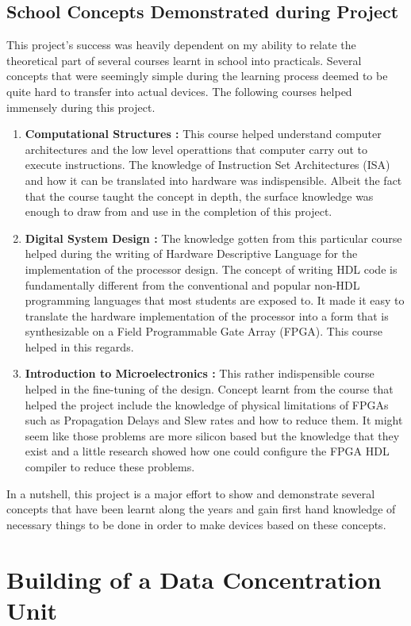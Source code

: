 \subsection{School Concepts Demonstrated during Project}
This project's success was heavily dependent on my ability to relate the theoretical part of several courses learnt in school into practicals. Several concepts that were seemingly simple during the learning process deemed to be quite hard to transfer into actual devices. The following courses helped immensely during this project.
\begin{enumerate}
\item \textbf{Computational Structures :} This course helped understand computer architectures and the low level operattions that computer carry out to execute instructions. The knowledge of Instruction Set Architectures (ISA) and how it can be translated into hardware was indispensible. Albeit the fact that the course taught the concept in depth, the surface knowledge was enough to draw from and use in the completion of this project.
\item \textbf{Digital System Design :} The knowledge gotten from this particular course helped during the writing of Hardware Descriptive Language for the implementation of the processor design. The concept of writing HDL code is fundamentally different from the conventional and popular non-HDL programming languages that most students are exposed to. It made it easy to translate the hardware implementation of the processor into a form that is synthesizable on a Field Programmable Gate Array (FPGA). This course helped in this regards.
\item \textbf{Introduction to Microelectronics :} This rather indispensible course helped in the fine-tuning of the design. Concept learnt from the course that helped the project include the knowledge of physical limitations of FPGAs such as Propagation Delays and Slew rates and how to reduce them. It might seem like those problems are more silicon based but the knowledge that they exist and a little research showed how one could configure the FPGA HDL compiler to reduce these problems.
\end{enumerate}
In a nutshell, this project is a major effort to show and demonstrate several concepts that have been learnt along the years and gain first hand knowledge of necessary things to be done in order to make devices based on these concepts.



\section{Building of a Data Concentration Unit}
